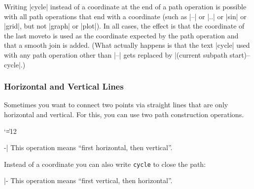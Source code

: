 Writing |cycle| instead of a coordinate at the end of a path operation is
possible with all path operations that end with a coordinate (such as |--| or
|..| or |sin| or |grid|, but not |graph| or |plot|). In all cases, the effect
is that the coordinate of the last moveto is used as the coordinate expected by
the path operation and that a smooth join is added. (What actually happens is
that the text |cycle| used with any path operation other than |--| gets
replaced by |(current subpath start)--cycle|.)


\subsubsection{Horizontal and Vertical Lines}

Sometimes you want to connect two points via straight lines that are only
horizontal and vertical. For this, you can use two path construction
operations.

{\catcode`\|=12
\begin{pathoperation}[noindex]{-|}{}
    \pgfmanualpdflabel[\catcode`\|=12 ]{-|}{}%
    This operation means ``first horizontal, then vertical''.
\begin{codeexample}[]
\end{codeexample}
    Instead of a coordinate you can also write \verb!cycle! to close the path:
\begin{codeexample}[]
\end{codeexample}
\end{pathoperation}

\begin{pathoperation}[noindex]{|-}{}
    \pgfmanualpdflabel[\catcode`\|=12 ]{|-}{}%
    This operation means ``first vertical, then horizontal''.
\end{pathoperation}
}



